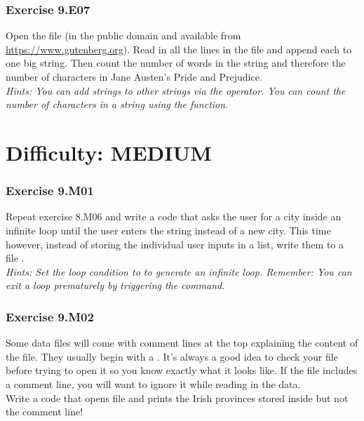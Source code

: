 
\subsubsection*{Exercise 9.E07}
Open the file {} (in the public domain and available
from \url{https://www.gutenberg.org}). Read in all the lines in the file and append each to one big string. Then count the number of words in the string and therefore the number of characters in Jane Austen’s Pride and Prejudice.\\


\textit{Hints:
You can add strings to other strings via the {\code{+}} operator. You can count the number of
characters in a string using the {} function.}



\newpage
\section{Difficulty: MEDIUM}

\subsubsection*{Exercise 9.M01}
Repeat exercise 8.M06 and write a code that asks the user for a city inside an infinite {} loop until the user enters the string {} instead of a new city. This time however, instead of storing the individual user inputs in a list, write them to a file {}.\\


\textit{Hints:
Set the loop condition to {} to generate an infinite loop. Remember: You can exit a loop prematurely by triggering the {} command.}\\[1cm]


\subsubsection*{Exercise 9.M02}
Some data files will come with comment lines at the top explaining the content of the file.
They usually begin with a {\code{\#}}. It’s always a good idea to check your file before trying to open it so you know exactly what it looks like. If the file includes a comment line, you will want to ignore it while reading in the data.\\
Write a code that opens file {} and prints the Irish provinces stored inside but not the comment line!\\


